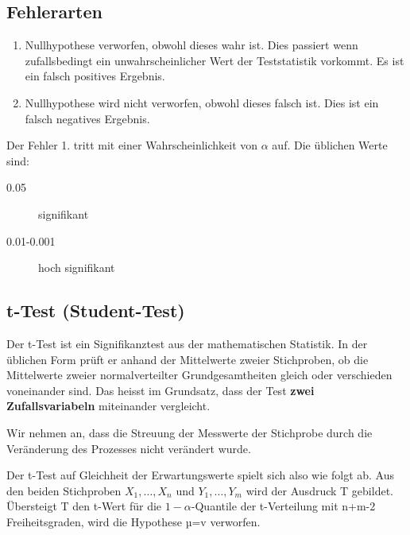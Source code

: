 \documentclass[../Main.tex]{subfiles}
\begin{document}
\subsection{Fehlerarten}
\begin{enumerate}
    \item Nullhypothese verworfen, obwohl dieses wahr ist. Dies passiert wenn zufallsbedingt ein unwahrscheinlicher Wert
    der Teststatistik vorkommt. Es ist ein falsch positives Ergebnis.
    \item Nullhypothese wird nicht verworfen, obwohl dieses falsch ist. Dies ist ein falsch negatives Ergebnis.
\end{enumerate}
Der Fehler 1. tritt mit einer Wahrscheinlichkeit von \(\alpha\) auf.
Die üblichen Werte sind:
\begin{description}
    \item[0.05] signifikant
    \item[0.01-0.001] hoch signifikant 
\end{description}

\subsection{t-Test (Student-Test)}
Der t-Test ist ein Signifikanztest aus der mathematischen Statistik.
In der üblichen Form prüft er anhand der Mittelwerte zweier Stichproben, 
ob die Mittelwerte zweier normalverteilter Grundgesamtheiten gleich oder verschieden voneinander sind.
Das heisst im Grundsatz, dass der Test \textbf{zwei Zufallsvariabeln} miteinander vergleicht.


Wir nehmen an, dass die Streuung der Messwerte der Stichprobe durch die Veränderung des Prozesses
nicht verändert wurde.

Der t-Test auf Gleichheit der Erwartungswerte spielt sich also wie folgt ab. Aus den beiden
Stichproben \(X_1,\dots,X_n\) und \(Y_1,\dots,Y_m\) wird der Ausdruck T gebildet. Übersteigt T den
t-Wert für die \(1-\alpha\)-Quantile der t-Verteilung mit n+m-2 Freiheitsgraden, wird die Hypothese
µ=v verworfen.
\end{document}
